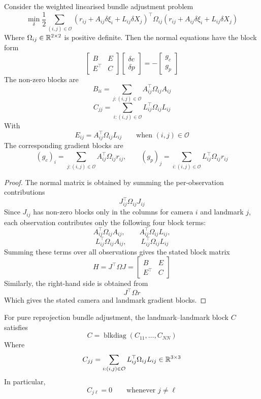 \documentclass[11pt]{article}
\begin{document}
\begin{theorem}
Consider the weighted linearised bundle adjustment problem
\[
\min_\delta
\frac12
\sum_{(i,j)\in\mathcal O}
(r_{ij}+A_{ij}\delta \xi_i+L_{ij}\delta X_j)^\top
\Omega_{ij}
(r_{ij}+A_{ij}\delta \xi_i+L_{ij}\delta X_j)
\]
Where \(\Omega_{ij}\in\mathbb{R}^{2\times 2}\) is positive definite. Then the normal equations have the block form
\[
\begin{bmatrix}
B & E\\
E^\top & C
\end{bmatrix}
\begin{bmatrix}
\delta c\\
\delta p
\end{bmatrix}
=
-
\begin{bmatrix}
g_c\\
g_p
\end{bmatrix}
\]
The non-zero blocks are
\[
B_{ii}
=
\sum_{j:(i,j)\in\mathcal O}
A_{ij}^\top \Omega_{ij}A_{ij}
\]
\[
C_{jj}
=
\sum_{i:(i,j)\in\mathcal O}
L_{ij}^\top \Omega_{ij}L_{ij}
\]
With
\[
E_{ij}
=
A_{ij}^\top \Omega_{ij}L_{ij}
\qquad \text{when } (i,j)\in\mathcal O
\]
The corresponding gradient blocks are
\[
(g_c)_i
=
\sum_{j:(i,j)\in\mathcal O}
A_{ij}^\top \Omega_{ij}r_{ij},
\qquad
(g_p)_j
=
\sum_{i:(i,j)\in\mathcal O}
L_{ij}^\top \Omega_{ij}r_{ij}
\]
\end{theorem}

\begin{proof}
The normal matrix is obtained by summing the per-observation contributions
\[
J_{ij}^\top \Omega_{ij} J_{ij}
\]
Since \(J_{ij}\) has non-zero blocks only in the columns for camera \(i\) and landmark \(j\), each observation contributes only the following four block terms:
\[
A_{ij}^\top\Omega_{ij}A_{ij},
\qquad
A_{ij}^\top\Omega_{ij}L_{ij},
\]
\[
L_{ij}^\top\Omega_{ij}A_{ij},
\qquad
L_{ij}^\top\Omega_{ij}L_{ij}
\]
Summing these terms over all observations gives the stated block matrix
\[
H=
J^\top\Omega J
=
\begin{bmatrix}
B & E\\
E^\top & C
\end{bmatrix}
\]
Similarly, the right-hand side is obtained from
\[
J^\top\Omega r
\]
Which gives the stated camera and landmark gradient blocks.
\end{proof}

\begin{proposition}
For pure reprojection bundle adjustment, the landmark--landmark block \(C\) satisfies
\[
C=\operatorname{blkdiag}(C_{11},\dots,C_{NN})
\]
Where
\[
C_{jj}
=
\sum_{i:(i,j)\in\mathcal O}
L_{ij}^\top \Omega_{ij}L_{ij}
\in\mathbb{R}^{3\times 3}
\]
In particular,
\[
C_{j\ell}=0
\qquad
\text{whenever } j\neq \ell
\]
\end{proposition}
\end{document}
